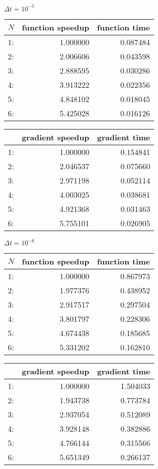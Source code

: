 \begin{center}
$\Delta t=10^{-5}$\\
\begin{tabular}{lrr}
\toprule
{}$N$ &  function speedup &    function  time \\
\midrule
1:  &  1.000000 &  0.087484 \\
2: &  2.006606 &  0.043598 \\
3: &  2.888595 &  0.030286 \\
4: &  3.913222 &  0.022356 \\
5: &  4.848102 &  0.018045 \\
6: &  5.425028 &  0.016126 \\
\bottomrule
\end{tabular}
\begin{tabular}{lrr}
\toprule
{} &  gradient speedup &     gradient time \\
\midrule
1:  &  1.000000 &  0.154841 \\
2: &  2.046537 &  0.075660 \\
3: &  2.971198 &  0.052114 \\
4: &  4.003025 &  0.038681 \\
5: &  4.921368 &  0.031463 \\
6: &  5.755101 &  0.026905 \\
\bottomrule
\end{tabular}
\end{center}
\begin{center}
$\Delta t=10^{-6}$\\
\begin{tabular}{lrr}
\toprule
{} $N$&  function speedup &    function time \\
\midrule
1:  &  1.000000 &  0.867973 \\
2: &  1.977376 &  0.438952 \\
3: &  2.917517 &  0.297504 \\
4: &  3.801797 &  0.228306 \\
5: &  4.674438 &  0.185685 \\
6: &  5.331202 &  0.162810 \\
\bottomrule
\end{tabular}
\begin{tabular}{lrr}
\toprule
{} &  gradient speedup &    gradient time \\
\midrule
1:  &  1.000000 &  1.504033 \\
2: &  1.943738 &  0.773784 \\
3: &  2.937054 &  0.512089 \\
4: &  3.928148 &  0.382886 \\
5: &  4.766144 &  0.315566 \\
6: &  5.651349 &  0.266137 \\
\bottomrule
\end{tabular}
\end{center}
